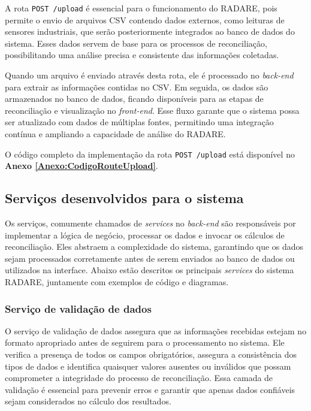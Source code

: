 A rota \texttt{POST /upload} é essencial para o funcionamento do RADARE, pois permite o envio de arquivos CSV contendo dados externos, como leituras de sensores industriais, que serão posteriormente integrados ao banco de dados do sistema. Esses dados servem de base para os processos de reconciliação, possibilitando uma análise precisa e consistente das informações coletadas.

Quando um arquivo é enviado através desta rota, ele é processado no \textit{back-end} para extrair as informações contidas no CSV. Em seguida, os dados são armazenados no banco de dados, ficando disponíveis para as etapas de reconciliação e visualização no \textit{front-end}. Esse fluxo garante que o sistema possa ser atualizado com dados de múltiplas fontes, permitindo uma integração contínua e ampliando a capacidade de análise do RADARE.

O código completo da implementação da rota \texttt{POST /upload} está disponível no \textbf{Anexo \ref{Anexo:CodigoRouteUpload}}.

\subsection{Serviços desenvolvidos para o sistema}

Os serviços, comumente chamados de \textit{services} no \textit{back-end} são responsáveis por implementar a lógica de negócio, processar os dados e invocar os cálculos de reconciliação. Eles abstraem a complexidade do sistema, garantindo que os dados sejam processados corretamente antes de serem enviados ao banco de dados ou utilizados na interface. Abaixo estão descritos os principais \textit{services} do sistema RADARE, juntamente com exemplos de código e diagramas.

\subsubsection{Serviço de validação de dados}

O serviço de validação de dados assegura que as informações recebidas estejam no formato apropriado antes de seguirem para o processamento no sistema. Ele verifica a presença de todos os campos obrigatórios, assegura a consistência dos tipos de dados e identifica quaisquer valores ausentes ou inválidos que possam comprometer a integridade do processo de reconciliação. Essa camada de validação é essencial para prevenir erros e garantir que apenas dados confiáveis sejam considerados no cálculo dos resultados.

